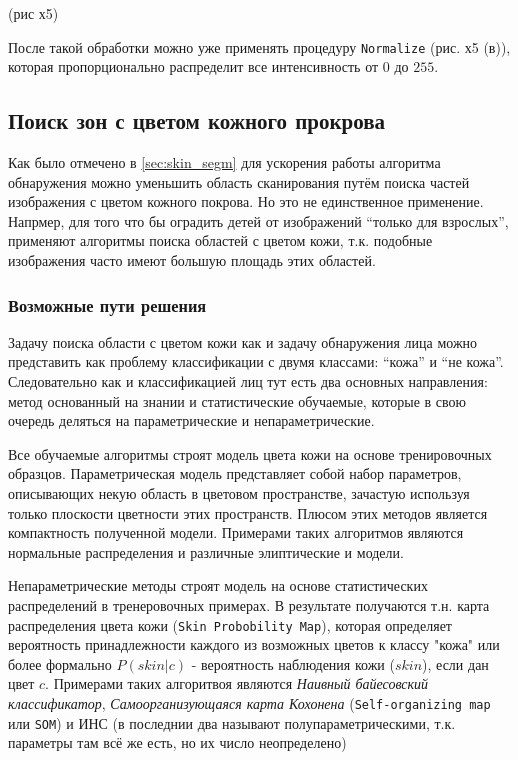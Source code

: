 \documentclass[12pt]{report}
\begin{document}
(рис х5)

После такой обработки можно уже применять процедуру \texttt{Normalize} (рис. х5 (в)), которая пропорционально распределит все интенсивность от $0$ до $255$.

\subsection{Поиск зон с цветом кожного прокрова}
\label{sec:skin_detection}
Как было отмечено в \ref{sec:skin_segm} для ускорения работы алгоритма обнаружения можно уменьшить область сканирования путём поиска частей изображения с цветом кожного покрова. Но это не единственное применение. Напрмер, для того что бы оградить детей от изображений ``только для взрослых'', применяют алгоритмы поиска областей с цветом кожи, т.к. подобные изображения часто имеют большую площадь этих областей. \citep{forsyth1999automatic} \citep{zheng2004blocking}

\subsubsection{Возможные пути решения}
Задачу поиска области с цветом кожи как и задачу обнаружения лица можно представить как проблему классификации с двумя классами: ``кожа'' и ``не кожа''. Следовательно как и классификацией лиц тут есть два основных направления: метод основанный на знании и статистические обучаемые, которые в свою очередь деляться на параметрические и непараметрические. \citep{vezhnevets2003survey}

Все обучаемые алгоритмы строят модель цвета кожи на основе тренировочных образцов. Параметрическая модель представляет собой набор параметров, описывающих некую область в цветовом пространстве, зачастую используя только плоскости цветности этих пространств. Плюсом этих методов является компактность полученной модели. Примерами таких алгоритмов являются нормальные распределения и различные элиптические и модели.

Непараметрические методы строят модель на основе статистических распределений в тренеровочных примерах. В результате получаются т.н. карта распределения цвета кожи (\texttt{Skin Probobility Map}), которая определяет вероятность принадлежности каждого из возможных цветов к классу "кожа" или более формально $P(skin|c)$ - вероятность наблюдения кожи ($skin$), если дан цвет $c$. Примерами таких алгоритвоя являются \emph{Наивный байесовский классификатор}, \emph{Самоорганизующаяся карта Кохонена} (\texttt{Self-organizing map} или \texttt{SOM}) и ИНС (в \citep{xu2006color} последнии два называют полупараметрическими, т.к. параметры там всё же есть, но их число неопределено)
\end{document}
